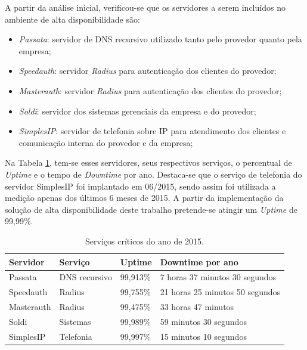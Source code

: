 A partir da análise inicial, verificou-se que os servidores a serem incluídos no ambiente de alta disponibilidade são:
\begin{itemize}
 \item \textit{Passata}: servidor de \ac{DNS} recursivo utilizado tanto pelo provedor quanto pela empresa;
 \item \textit{Speedauth}: servidor \textit{Radius} para autenticação dos clientes do provedor;
 \item \textit{Masterauth}: servidor \textit{Radius} para autenticação dos clientes do provedor;
 \item \textit{Soldi}: servidor dos sistemas gerenciais da empresa e do provedor;
 \item \textit{SimplesIP}: servidor de telefonia sobre \ac{IP} para atendimento dos clientes e comunicação interna do provedor e da empresa;
\end{itemize}

Na Tabela \ref{tab:dispservcrit}, tem-se esses servidores, seus respectivos serviços, o percentual de \textit{Uptime} e o tempo de 
\textit{Downtime} por ano. Destaca-se que o serviço de telefonia do servidor SimplesIP foi implantado em 06/2015, sendo assim foi utilizada a 
medição apenas dos últimos 6 meses de 2015.
A partir da implementação da solução de alta disponibilidade deste trabalho pretende-se atingir um \textit{Uptime} de 99,99\%.

\begin{table}[h!]
\caption{Serviços críticos do ano de 2015.}
\label{tab:dispservcrit}
\begin{center}
\begin{tabular}{|l|l|l|l|}\hline
\textbf{Servidor} & \textbf{Serviço} & \textbf{Uptime} & \textbf{Downtime por ano} \\\hline
Passata & DNS recursivo & 99,913\% & 7 horas 37 minutos 30 segundos \\\hline
Speedauth & Radius & 99,755\% & 21 horas 25 minutos 50 segundos \\\hline
Masterauth & Radius & 99,475\% & 33 horas 47 minutos \\\hline
Soldi & Sistemas & 99,989\% & 59 minutos 30 segundos \\\hline
SimplesIP & Telefonia & 99,997\% & 15 minutos 10 segundos \\\hline %
\end{tabular}
\end{center}
\end{table}

